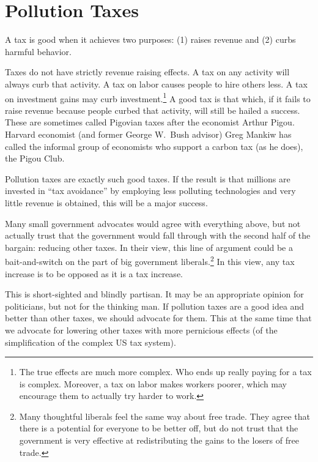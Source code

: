 
\section{Pollution Taxes}

A tax is good when it achieves two purposes: (1) raises revenue and (2) curbs
harmful behavior.

Taxes do not have strictly revenue raising effects. A tax on any activity will
always curb that activity. A tax on labor causes people to hire others
less. A tax on investment gains may curb investment.\footnote{The true effects
are much more complex. Who ends up really paying for a tax is complex.
Moreover, a tax on labor makes workers poorer, which may encourage them to
actually try harder to work.} A good tax is that which, if it fails to raise
revenue because people curbed that activity, will still be hailed a success.
These are sometimes called Pigovian taxes after the economist Arthur Pigou.
Harvard economist (and former George W.\ Bush advisor) Greg Mankiw has called
the informal group of economists who support a carbon tax (as he does), the
Pigou Club.

Pollution taxes are exactly such good taxes. If the result is that millions are
invested in ``tax avoidance'' by employing less polluting technologies and very
little revenue is obtained, this will be a major success.

Many small government advocates would agree with everything above, but not
actually trust that the government would fall through with the second half of
the bargain: reducing other taxes. In their view, this line of argument could
be a bait-and-switch on the part of big government liberals.\footnote{Many
thoughtful liberals feel the same way about free trade. They agree that there
is a potential for everyone to be better off, but do not trust that the
government is very effective at redistributing the gains to the losers of free
trade.} In this view, any tax increase is to be opposed as it is a tax
increase.

This is short-sighted and blindly partisan. It may be an appropriate opinion
for politicians, but not for the thinking man. If pollution taxes are a good
idea and better than other taxes, we should advocate for them. This at the same
time that we advocate for lowering other taxes with more pernicious effects (of
the simplification of the complex US tax system).

